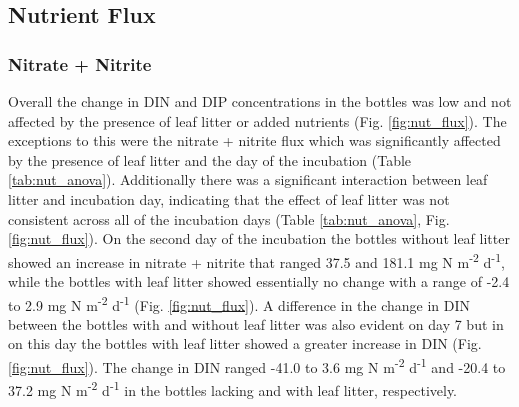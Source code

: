 
\subsection{Nutrient Flux}
\subsubsection{Nitrate + Nitrite}

Overall the change in DIN and DIP concentrations in the bottles was low and not affected by the presence of leaf litter or added nutrients (Fig. \ref{fig:nut_flux}).  The exceptions to this were the nitrate + nitrite flux which was significantly affected by the presence of leaf litter and the day of the incubation (Table \ref{tab:nut_anova}).  Additionally there was a significant interaction between leaf litter and incubation day, indicating that the effect of leaf litter was not consistent across all of the incubation days (Table \ref{tab:nut_anova}, Fig. \ref{fig:nut_flux}). On the second day of the incubation the bottles without leaf litter showed an increase in nitrate + nitrite that ranged 37.5 and 181.1 mg N m\textsuperscript{-2} d\textsuperscript{-1}, while the bottles with leaf litter showed essentially no change with a range of -2.4 to 2.9 mg N m\textsuperscript{-2} d\textsuperscript{-1} (Fig. \ref{fig:nut_flux}).  A difference in the change in DIN between the bottles with and without leaf litter was also evident on day 7 but in on this day the bottles with leaf litter showed a greater increase in DIN (Fig. \ref{fig:nut_flux}). The change in DIN ranged -41.0 to 3.6 mg N m\textsuperscript{-2} d\textsuperscript{-1} and -20.4 to 37.2 mg N m\textsuperscript{-2} d\textsuperscript{-1} in the bottles lacking and with leaf litter, respectively.
